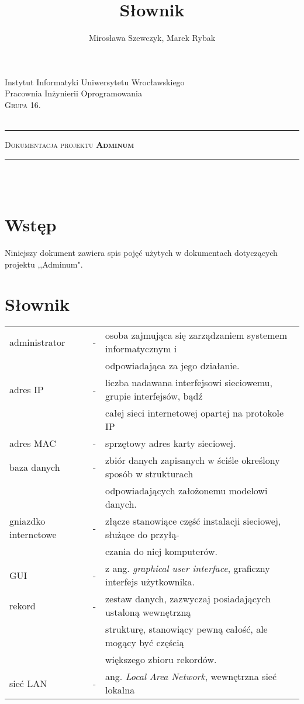 \documentclass[12pt,a4paper,notitlepage]{article}
\author{Mirosława Szewczyk, Marek Rybak}
\title{Słownik}
\makeatletter
\newcommand{\linia}{\rule{\linewidth}{0.4mm}}
\renewcommand{\maketitle}{\begin{titlepage}
    \vspace*{2cm}
    \begin{center}\small        
        Instytut Informatyki Uniwersytetu Wrocławskiego\\
        Pracownia Inżynierii Oprogramowania\\
  \vspace{2cm}
        \normalsize \textsc{Grupa 16.}\\
        \normalsize \textsc{\@author}\\
\end{center}
    \vspace{3cm}
    \noindent\linia
    \begin{center}
        \LARGE \textsc{Dokumentacja projektu \textbf{Adminum}}\\       
        \linia
        \vspace{2cm}
        \LARGE \textsc{\@title}\\
      
        \vspace{1.5cm}
       \normalsize \@date\\




    \end{center}
  \end{titlepage}
}
\makeatother
\begin{document}
    \maketitle
\setcounter{page}{2}
    \tableofcontents
    \newpage
    \section{Wstęp}
Niniejszy dokument zawiera spis pojęć użytych w dokumentach dotyczących projektu ,,Adminum".
   \section{Słownik}
\begin{tabular}{lcl}
administrator & -  & osoba zajmująca się zarządzaniem systemem informatycznym i \\
& &odpowiadająca za jego działanie. \\
adres IP & -  & liczba nadawana interfejsowi sieciowemu, grupie interfejsów, bądź \\
& & całej sieci internetowej opartej na protokole IP \\
adres MAC & -  &sprzętowy adres karty sieciowej.\\
baza danych & -  &zbiór danych zapisanych w ściśle określony sposób w strukturach \\
& &odpowiadających założonemu modelowi danych. \\
gniazdko internetowe & -  &złącze stanowiące część instalacji sieciowej, służące do przyłą- \\
& &czania do niej komputerów.  \\
GUI & -  &z ang. \textit{graphical user interface}, graficzny interfejs użytkownika.\\
rekord & -  & zestaw danych, zazwyczaj posiadających ustaloną wewnętrzną\\
& & strukturę, stanowiący pewną całość, ale mogący być częścią\\
& & większego zbioru rekordów. \\
sieć LAN & - & ang. \textit{Local Area Network}, wewnętrzna sieć lokalna




\end{tabular}


	
\end{document}
